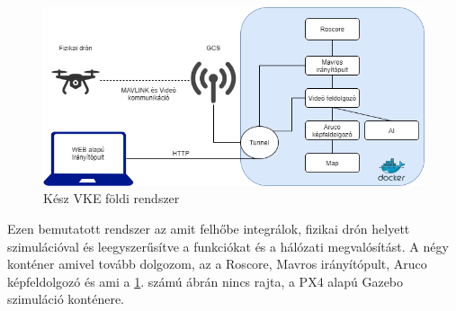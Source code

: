 \begin{figure}
	\centering
	\includegraphics[width=\linewidth]{figures/vke_drone.png}
	\caption{Kész VKE földi rendszer}
	\label{fig:vke}
\end{figure}

Ezen bemutatott rendszer az amit felhőbe integrálok, fizikai drón helyett szimulációval és leegyszerűsítve a funkciókat és a hálózati megvalósítást. A négy konténer amivel tovább dolgozom, az a Roscore, Mavros irányítópult, Aruco képfeldolgozó és ami a \ref{fig:vke}. számú ábrán nincs rajta, a PX4 alapú Gazebo szimuláció konténere.